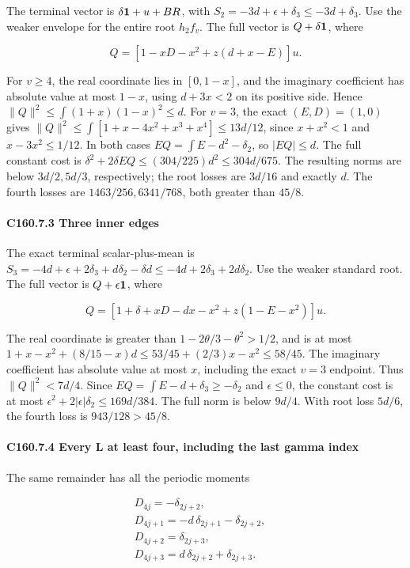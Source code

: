 The terminal vector is \(\delta\mathbf1+u+BR\), with \(S_2=-3d+\epsilon+\delta_3\le-3d+\delta_3\). Use the weaker envelope for the entire root \(h_2f_v\). The full vector is \(Q+\delta\mathbf1\), where

\[
Q=[1-xD-x^2+z(d+x-E)]u.
\]

For \(v\ge4\), the real coordinate lies in \([0,\allowbreak \allowbreak  1-x]\), and the imaginary coefficient has absolute value at most \(1-x\), using \(d+3x<2\) on its positive side. Hence \(\|Q\|^2\le\int(1+x)(1-x)^2\le d\). For \(v=3\), the exact \((E,\allowbreak \allowbreak  D)=(1,\allowbreak \allowbreak  0)\) gives \(\|Q\|^2\le\int[1+x-4x^2+x^3+x^4]\le13d/12\), since \(x+x^2<1\) and \(x-3x^2\le1/12\). In both cases \(EQ=\int E-d^2-\delta_2\), so \(|EQ|\le d\). The full constant cost is \(\delta^2+2\delta EQ\le(304/225)d^2\le304d/675\). The resulting norms are below \(3d/2,\allowbreak \allowbreak  5d/3\), respectively; the root losses are \(3d/16\) and exactly \(d\). The fourth losses are \(1463/256,\allowbreak \allowbreak  6341/768\), both greater than \(45/8\).

\paragraph{C160.7.3 Three inner edges}

The exact terminal scalar-plus-mean is \(S_3=-4d+\epsilon+2\delta_3+d\delta_2-\delta d\le-4d+2\delta_3+2d\delta_2\). Use the weaker standard root. The full vector is \(Q+\epsilon\mathbf1\), where

\[
Q=[1+\delta+xD-dx-x^2+z(1-E-x^2)]u.
\]

The real coordinate is greater than \(1-2\theta/3-\theta^2>1/2\), and is at most \(1+x-x^2+(8/15-x)d\le53/45+(2/3)x-x^2\le58/45\). The imaginary coefficient has absolute value at most \(x\), including the exact \(v=3\) endpoint. Thus \(\|Q\|^2<7d/4\). Since \(EQ=\int E-d+\delta_3\ge-\delta_2\) and \(\epsilon\le0\), the constant cost is at most \(\epsilon^2+2|\epsilon|\delta_2\le169d/384\). The full norm is below \(9d/4\). With root loss \(5d/6\), the fourth loss is \(943/128>45/8\).

\paragraph{C160.7.4 Every L at least four, including the last gamma index}\label{part:C160.7.4}

The same remainder has all the periodic moments

\[
\begin{gathered}
D_{4j}=-\delta_{2j+2},\quad\\
D_{4j+1}=-d\,\delta_{2j+1}-\delta_{2j+2},\quad\\
D_{4j+2}=\delta_{2j+3},\quad\\
D_{4j+3}=d\,\delta_{2j+2}+\delta_{2j+3}.
\end{gathered}
\]

